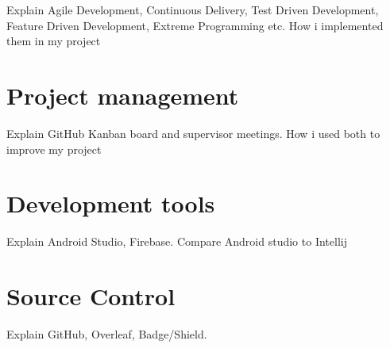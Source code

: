 \par
\par
\medskip


Explain Agile Development, Continuous Delivery, Test Driven Development, Feature Driven Development, Extreme Programming etc.
How i implemented them in my project

\section{Project management}
Explain GitHub Kanban board and supervisor meetings. How i used both to improve my project

\section{Development tools}
Explain Android Studio, Firebase. Compare Android studio to Intellij

\section{Source Control}
Explain GitHub, Overleaf, Badge/Shield. 
